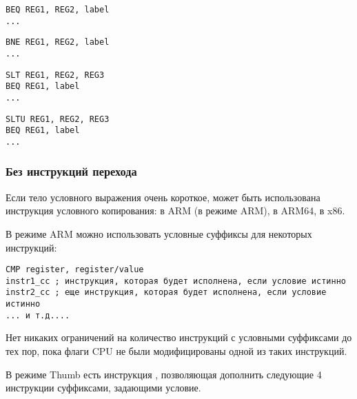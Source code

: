 \begin{lstlisting}[caption=Проверка на равенство,style=customasmMIPS]
BEQ REG1, REG2, label
...
\end{lstlisting}

\begin{lstlisting}[caption=Проверка на неравенство,style=customasmMIPS]
BNE REG1, REG2, label
...
\end{lstlisting}

\begin{lstlisting}[caption=Проверка на меньше (знаковое),style=customasmMIPS]
SLT REG1, REG2, REG3
BEQ REG1, label
...
\end{lstlisting}

\begin{lstlisting}[caption=Проверка на меньше (беззнаковое),style=customasmMIPS]
SLTU REG1, REG2, REG3
BEQ REG1, label
...
\end{lstlisting}

\subsubsection{Без инструкций перехода}


Если тело условного выражения очень короткое, может быть
использована инструкция условного копирования:  в ARM (в режиме ARM),  в ARM64,  в x86.


В режиме ARM можно использовать условные суффиксы для некоторых инструкций:

\begin{lstlisting}[caption=ARM (\ARMMode),style=customasmARM]
CMP register, register/value
instr1_cc ; инструкция, которая будет исполнена, если условие истинно
instr2_cc ; еще инструкция, которая будет исполнена, если условие истинно
... и т.д....
\end{lstlisting}

Нет никаких ограничений на количество инструкций с условными суффиксами до тех пор,
пока флаги CPU не были модифицированы одной из таких инструкций.


В режиме Thumb есть инструкция , позволяющая дополнить следующие 4 инструкции суффиксами, задающими
условие.

